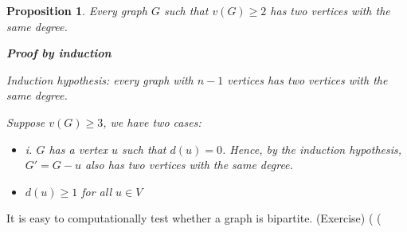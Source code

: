 \documentclass{article}
\newtheorem{proposition}{Proposition}
\begin{document}
\begin{proposition}
	Every graph $G$ such that $v(G) \geq 2$ has two vertices with the same degree.
	
	\textbf{Proof by induction}
	
	Induction hypothesis: every graph with $n-1$ vertices has two vertices with the same degree.
	
	Suppose $v(G) \geq 3$, we have two cases:
	
	\begin{itemize}
		\item i. $G$ has a vertex $u$ such that $d(u) = 0$. Hence, by the induction hypothesis, $G'= G - u$ also has two vertices with the same degree.
		
		\item $d(u) \geq 1$ for all $u \in V$
	\end{itemize}
	
	
	
	
\end{proposition}


It is easy to computationally test whether a graph is bipartite. (Exercise)
\left( \left( 

\end{document}
